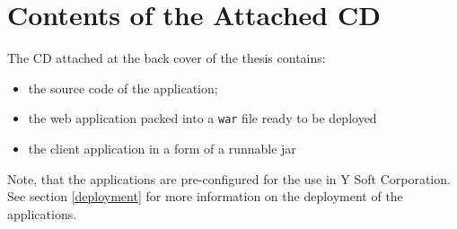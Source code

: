 \documentclass[11pt,singleside]{myfithesis2}
\begin{document}
\chapter{Contents of the Attached CD}
The CD attached at the back cover of the thesis contains:
\begin{itemize}
	\item the source code of the application;
	\item the web application packed into a \texttt{war} file ready to be deployed
	\item the client application in a form of a runnable jar 
\end{itemize}
Note, that the applications are pre-configured for the use in Y Soft Corporation. See section \ref{deployment} for more information on the deployment of the applications.
\end{document}
